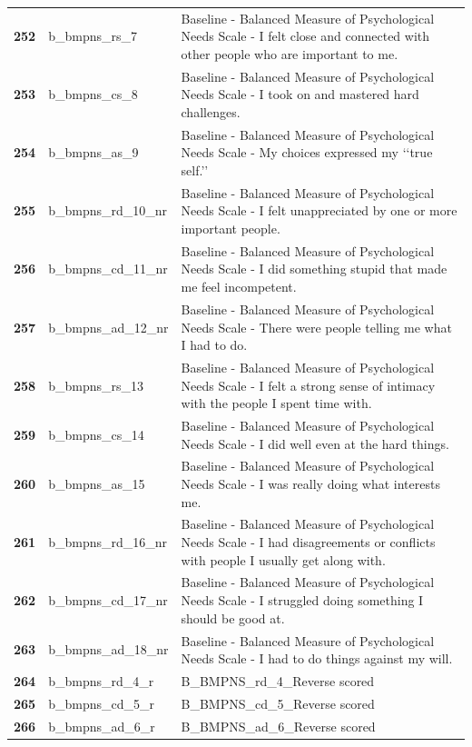 \documentclass[
  letterpaper,
  DIV=11,
  numbers=noendperiod]{scrartcl}
\begin{document}
\begin{longtable}[t]{>{}cll}
\textbf{252} & b\_bmpns\_rs\_7 & Baseline - Balanced Measure of Psychological Needs Scale - I felt close and connected with other people who are important to me.\\
\textbf{253} & b\_bmpns\_cs\_8 & Baseline - Balanced Measure of Psychological Needs Scale - I took on and mastered hard challenges.\\
\textbf{254} & b\_bmpns\_as\_9 & Baseline - Balanced Measure of Psychological Needs Scale - My choices expressed my ‘‘true self.’’\\
\textbf{255} & b\_bmpns\_rd\_10\_nr & Baseline - Balanced Measure of Psychological Needs Scale - I felt unappreciated by one or more important people.\\
\addlinespace
\textbf{256} & b\_bmpns\_cd\_11\_nr & Baseline - Balanced Measure of Psychological Needs Scale - I did something stupid that made me feel incompetent.\\
\textbf{257} & b\_bmpns\_ad\_12\_nr & Baseline - Balanced Measure of Psychological Needs Scale - There were people telling me what I had to do.\\
\textbf{258} & b\_bmpns\_rs\_13 & Baseline - Balanced Measure of Psychological Needs Scale - I felt a strong sense of intimacy with the people I spent time with.\\
\textbf{259} & b\_bmpns\_cs\_14 & Baseline - Balanced Measure of Psychological Needs Scale - I did well even at the hard things.\\
\textbf{260} & b\_bmpns\_as\_15 & Baseline - Balanced Measure of Psychological Needs Scale - I was really doing what interests me.\\
\addlinespace
\textbf{261} & b\_bmpns\_rd\_16\_nr & Baseline - Balanced Measure of Psychological Needs Scale - I had disagreements or conflicts with people I usually get along with.\\
\textbf{262} & b\_bmpns\_cd\_17\_nr & Baseline - Balanced Measure of Psychological Needs Scale - I struggled doing something I should be good at.\\
\textbf{263} & b\_bmpns\_ad\_18\_nr & Baseline - Balanced Measure of Psychological Needs Scale - I had to do things against my will.\\
\textbf{264} & b\_bmpns\_rd\_4\_r & B\_BMPNS\_rd\_4\_Reverse scored\\
\textbf{265} & b\_bmpns\_cd\_5\_r & B\_BMPNS\_cd\_5\_Reverse scored\\
\addlinespace
\textbf{266} & b\_bmpns\_ad\_6\_r & B\_BMPNS\_ad\_6\_Reverse scored\\

\end{longtable}
\end{document}
